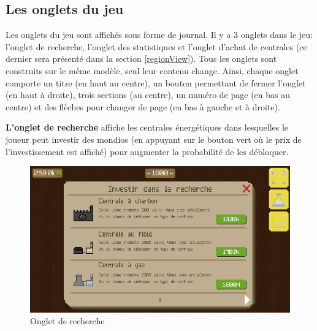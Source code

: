 \documentclass{article}
\begin{document}
		\subsection{Les onglets du jeu} \label{onglets}
		Les onglets du jeu sont affichés sous forme de journal.
		Il y a 3 onglets dans le jeu: l'onglet de recherche, l'onglet des statistiques et l'onglet d'achat de centrales (ce dernier sera présenté dans la section \ref{regionView}).
		Tous les onglets sont construits sur le même modèle, seul leur contenu change. Ainsi, chaque onglet comporte un titre (en haut au centre), un bouton permettant de fermer l'onglet (en haut à droite), trois sections (au centre), un numéro de page (en bas au centre) et des flèches pour changer de page (en bas à gauche et à droite).
		
		
		\textbf{L'onglet de recherche} affiche les centrales énergétiques dans lesquelles le joueur peut investir des mondios (en appuyant sur le bouton vert où le prix de l'investissement est affiché) pour augmenter la probabilité de les débloquer.
		
		\begin{figure}[H]
                \includegraphics[width=\linewidth]{../images/recherche}
                \caption{Onglet de recherche}
                \label{fig:research}
        \end{figure}
        
\end{document}
